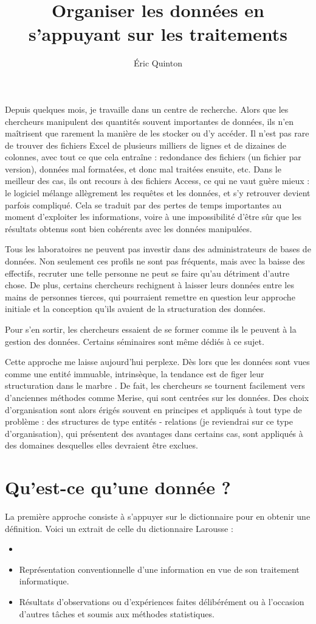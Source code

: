 \documentclass[10pt,a4paper,titlepage]{article}
\author{Éric Quinton}
\title{Organiser les données en s'appuyant sur les traitements}
\begin{document}
Depuis quelques mois, je travaille dans un centre de recherche. Alors que les chercheurs manipulent des quantités souvent importantes de données, ils n'en maîtrisent que rarement la manière de les stocker ou d'y accéder. 
Il n'est pas rare de trouver des fichiers Excel de plusieurs milliers de lignes et de dizaines de colonnes, avec tout ce que cela entraîne : redondance des fichiers (un fichier par version), données mal formatées, et donc mal traitées ensuite, etc. Dans le meilleur des cas, ils ont recours à des fichiers Access, ce qui ne vaut guère mieux : le logiciel mélange allègrement les requêtes et les données, et s'y retrouver devient parfois compliqué.
Cela se traduit par des pertes de temps importantes au moment d'exploiter les informations, voire à une impossibilité d'être sûr que les résultats obtenus sont bien cohérents avec les données manipulées.

Tous les laboratoires ne peuvent pas investir dans des administrateurs de bases de données. Non seulement ces profils ne sont pas fréquents, mais avec la baisse des effectifs, recruter une telle personne ne peut se faire qu'au détriment d'autre chose. De plus, certains chercheurs rechignent à laisser leurs données entre les mains de personnes tierces, qui pourraient remettre en question leur approche initiale et la conception qu'ils avaient de la structuration des données.

Pour s'en sortir, les chercheurs essaient de se former comme ils le peuvent à la gestion des données. Certains séminaires sont même dédiés à ce sujet.

Cette approche me laisse aujourd'hui perplexe. Dès lors que les données sont vues comme une entité immuable, intrinsèque, la tendance est de figer leur structuration \og dans le marbre \fg . De fait, les chercheurs se tournent facilement vers d'anciennes méthodes comme Merise, qui sont centrées sur les données.
Des choix d'organisation sont alors érigés souvent en principes et appliqués à tout type de problème : des structures de type \og entités - relations \fg (je reviendrai sur ce type d'organisation), qui présentent des avantages dans certains cas, sont appliqués à des domaines desquelles elles devraient être exclues.

\section{Qu'est-ce qu'une donnée ?}
La première approche consiste à s'appuyer sur le dictionnaire pour en obtenir une définition. Voici un extrait de celle du dictionnaire Larousse \cite{donnee_larousse} :
\og 
\begin{itemize}

\item \og 
\item Représentation conventionnelle d'une information en vue de son traitement informatique.
\item Résultats d'observations ou d'expériences faites délibérément ou à l'occasion d'autres tâches et soumis aux méthodes statistiques.\fg

\end{itemize}
\end{document}
